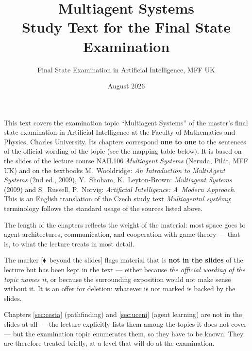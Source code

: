 \documentclass[11pt,a4paper]{article}
\title{\textbf{Multiagent Systems}\\[0.3em]\large Study Text for the Final State Examination}
\author{Final State Examination in Artificial Intelligence, MFF UK}
\date{August 2026}
\theoremstyle{definition}
\providecommand{\uv}[1]{``#1''}
\newcommand{\mimo}{\textcolor{markcol}{\textsf{\footnotesize[$\blacklozenge$~beyond the slides]}}}
\begin{document}
\maketitle

\vspace{-1.5em}

\begin{center}
\begin{minipage}{0.93\textwidth}
\small
This text covers the examination topic \uv{Multiagent Systems} of the master's final state
examination in Artificial Intelligence at the Faculty of Mathematics and Physics, Charles
University. Its chapters correspond \textbf{one to one} to the sentences of the official wording
of the topic (see the mapping table below). It is based on the slides of the lecture course
NAIL106 \emph{Multiagent Systems} (Neruda, Pilát, MFF UK) and on the textbooks
M.~Wooldridge: \emph{An Introduction to MultiAgent Systems} (2nd ed., 2009),
Y.~Shoham, K.~Leyton-Brown: \emph{Multiagent Systems} (2009)
and S.~Russell, P.~Norvig: \emph{Artificial Intelligence: A~Modern Approach}.
This is an English translation of the Czech study text \emph{Multiagentní systémy};
terminology follows the standard usage of the sources listed above.
\end{minipage}
\end{center}

\begin{center}
\begin{minipage}{0.93\textwidth}
\begin{poznbox}
\small
The length of the chapters reflects the weight of the material: most space goes to agent
architectures, communication, and cooperation with game theory --- that is, to what the lecture
treats in most detail.

The marker \mimo{} flags material that is \textbf{not in the slides} of the lecture but has been
kept in the text --- either because \emph{the official wording of the topic names it}, or
because the surrounding exposition would not make sense without it. It is an offer for deletion:
whatever is not marked is backed by the slides.

Chapters \ref{sec:cesta} (pathfinding) and \ref{sec:uceni} (agent learning) are not in the
slides at all --- the lecture explicitly lists them among the topics it does not cover --- but
the examination topic enumerates them, so they have to be known. They are therefore treated
briefly, at a level that will do at the examination.
\end{poznbox}
\end{minipage}
\end{center}
\end{document}
